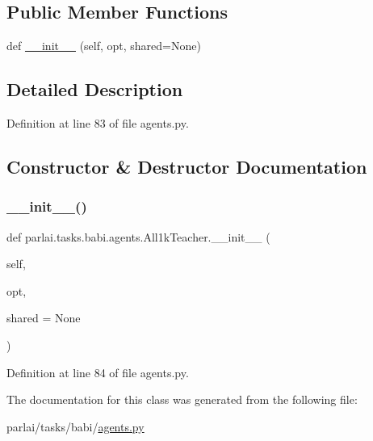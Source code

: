 \subsection*{Public Member Functions}
\begin{DoxyCompactItemize}
\item 
def \hyperlink{classparlai_1_1tasks_1_1babi_1_1agents_1_1All1kTeacher_ac78e7e860aad7926474025863ea9be4e}{\+\_\+\+\_\+init\+\_\+\+\_\+} (self, opt, shared=None)
\end{DoxyCompactItemize}


\subsection{Detailed Description}


Definition at line 83 of file agents.\+py.



\subsection{Constructor \& Destructor Documentation}
\mbox{\label{classparlai_1_1tasks_1_1babi_1_1agents_1_1All1kTeacher_ac78e7e860aad7926474025863ea9be4e}} 
\subsubsection{\texorpdfstring{\+\_\+\+\_\+init\+\_\+\+\_\+()}{\_\_init\_\_()}}
{\footnotesize\ttfamily def parlai.\+tasks.\+babi.\+agents.\+All1k\+Teacher.\+\_\+\+\_\+init\+\_\+\+\_\+ (\begin{DoxyParamCaption}\item[{}]{self,  }\item[{}]{opt,  }\item[{}]{shared = {\ttfamily None} }\end{DoxyParamCaption})}



Definition at line 84 of file agents.\+py.




The documentation for this class was generated from the following file\+:\begin{DoxyCompactItemize}
\item 
parlai/tasks/babi/\hyperlink{parlai_2tasks_2babi_2agents_8py}{agents.\+py}\end{DoxyCompactItemize}
